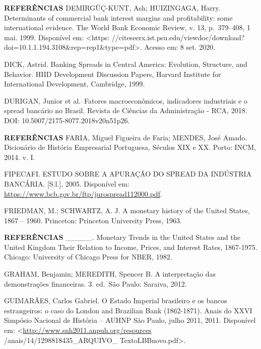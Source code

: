 \documentclass[
  ignorenonframetext,
  aspectratio=169,
  ignorenonframetext]{beamer}
\begin{document}
\begin{frame}{\textbf{REFERÊNCIAS}}
\protect\hypertarget{referuxeancias-12}{}
DEMIRGÜÇ-KUNT, Ash; HUIZINGAGA, Harry. Determinants of commercial bank
interest margins and profitability: some international evidence. The
World Bank Economic Review, v. 13, p.~379--408, 1 mai. 1999. Disponível
em: \textless https:
//citeseerx.ist.psu.edu/viewdoc/download?doi=10.1.1.194.3108\&rep=rep1\&type=pdf\textgreater.
Acesso em: 8 set. 2020.

DICK, Astrid. Banking Spreads in Central America: Evolution, Structure,
and Behavior. HIID Development Discussion Papers, Harvard Institute for
International Development, Cambridge, 1999.

DURIGAN, Junior et al.~Fatores macroeconômicos, indicadores industriais
e o spread bancário no Brasil. Revista de Ciências da Administração -
RCA, 2018. DOI: 10.5007/2175-8077.2018v20n51p26.
\end{frame}

\begin{frame}{\textbf{REFERÊNCIAS}}
\protect\hypertarget{referuxeancias-13}{}
FARIA, Miguel Figueira de Faria; MENDES, José Amado. Dicionário de
História Empresarial Portuguesa, Séculos XIX e XX. Porto: INCM, 2014. v.
I.

FIPECAFI. ESTUDO SOBRE A APURAÇÃO DO SPREAD DA INDÚSTRIA BANCÁRIA.
{[}S.l.{]}, 2005. Disponível em:
\url{https://www.bcb.gov.br/ftp/jurospread112000.pdf}.

FRIEDMAN, M.; SCHWARTZ, A. J. A monetary history of the United States,
1867 -- 1960. Princeton: Princeton University Press, 1963.
\end{frame}

\begin{frame}{\textbf{REFERÊNCIAS}}
\protect\hypertarget{referuxeancias-14}{}
\_\_\_\_\_. Monetary Trends in the United States and the United Kingdom
Their Relation to Income, Prices, and Interest Rates, 1867-1975.
Chicago: University of Chicago Press for NBER, 1982.

GRAHAM, Benjamin; MEREDITH, Spencer B. A interpretação das demonstrações
financeiras. 3. ed.~São Paulo: Saraiva, 2012.

GUIMARÃES, Carlos Gabriel. O Estado Imperial brasileiro e os bancos
estrangeiros: o caso do London and Brazilian Bank (1862-1871). Anais do
XXVI Simpósio Nacional de História -- AUHNP São Paulo, julho 2011, 2011.
Disponível em: \textless{}\url{http://www.snh2011.anpuh.org/resources}
/anais/14/1298818435\_ARQUIVO\_ TextoLBBnovo.pdf\textgreater.
\end{frame}
\end{document}
